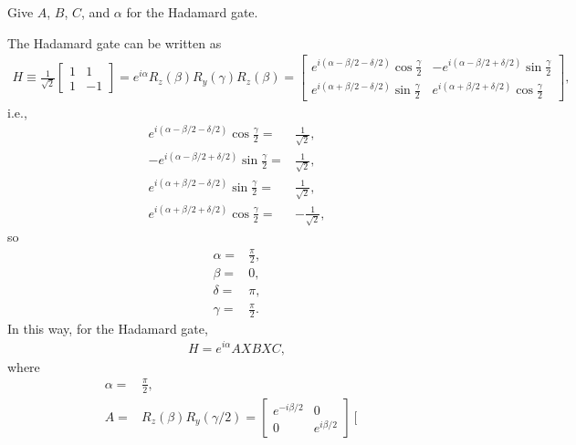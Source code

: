 \documentclass[en]{sol-man}
\begin{document}
\begin{exe}
    Give $A$, $B$, $C$, and $\alpha$ for the Hadamard gate.
\end{exe}
\begin{sol}
    The Hadamard gate can be written as
    \begin{align}
        H\equiv\frac{1}{\sqrt{2}}\left[\begin{matrix}
            1&1\\
            1&-1
        \end{matrix}\right]=e^{i\alpha}R_z(\beta)R_y(\gamma)R_z(\beta)=\left[\begin{matrix}
            e^{i(\alpha-\beta/2-\delta/2)}\cos\frac{\gamma}{2}&-e^{i(\alpha-\beta/2+\delta/2)}\sin\frac{\gamma}{2}\\
            e^{i(\alpha+\beta/2-\delta/2)}\sin\frac{\gamma}{2}&e^{i(\alpha+\beta/2+\delta/2)}\cos\frac{\gamma}{2}
        \end{matrix}\right],
    \end{align}
    i.e.,
    \begin{align}
        e^{i(\alpha-\beta/2-\delta/2)}\cos\frac{\gamma}{2}=&\frac{1}{\sqrt{2}},\\
        -e^{i(\alpha-\beta/2+\delta/2)}\sin\frac{\gamma}{2}=&\frac{1}{\sqrt{2}},\\
        e^{i(\alpha+\beta/2-\delta/2)}\sin\frac{\gamma}{2}=&\frac{1}{\sqrt{2}},\\
        e^{i(\alpha+\beta/2+\delta/2)}\cos\frac{\gamma}{2}=&-\frac{1}{\sqrt{2}},
    \end{align}
    so
    \begin{align}
        \alpha=&\frac{\pi}{2},\\
        \beta=&0,\\
        \delta=&\pi,\\
        \gamma=&\frac{\pi}{2}.
    \end{align}
    In this way, for the Hadamard gate,
    \begin{align}
        H=e^{i\alpha}AXBXC,
    \end{align}
    where
    \begin{align}
        \alpha=&\frac{\pi}{2},\\
        A=&R_z(\beta)R_y(\gamma/2)=\left[\begin{matrix}
            e^{-i\beta/2}&0\\
            0&e^{i\beta/2}
        \end{matrix}\right]\left[\begin{matrix}

\end{matrix}
\end{align}
\end{sol}
\end{document}
